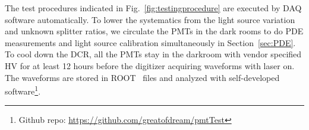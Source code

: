 The test procedures indicated in Fig.~\ref{fig:testingprocedure} are executed by DAQ software automatically. To lower the systematics from the light source variation and unknown splitter ratios, we circulate the PMTs in the dark rooms to do PDE measurements and light source calibration simultaneously in Section~\ref{sec:PDE}. To cool down the DCR, all the PMTs stay in the darkroom with vendor specified HV for at least 12 hours before the digitizer acquiring waveforms with laser on. The waveforms are stored in ROOT~\cite{brun_root_1997} files and analyzed with self-developed software\footnote{Github repo: \url{https://github.com/greatofdream/pmtTest}}.
